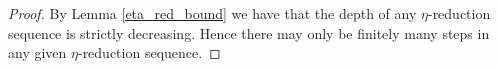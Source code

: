 \begin{proof}
    By Lemma \ref{eta_red_bound} we have that the depth of any $\eta$-reduction sequence is strictly decreasing. Hence there may only be finitely many steps in any given $\eta$-reduction sequence.
\end{proof}

\begin{comment}
We wish to show that $\eta$-reduction enjoys similar normalisation properties to $\beta$-reduction. This should be much easier since $\eta$-redexes are much more distinct.

\begin{defin}
    The \emph{($\eta$-)degree $\partial_{\eta}(t)$ of a redex} is defined as the degree of it's type. If $\Gamma \vdash t \Leftarrow T$ then $\partial_{\eta} := \partial(T)$. This is well-defined due to unicity of typing. [[REFERENCE INVERSION LEMMA HERE]]
\end{defin}

\begin{remark}
    Note that a property of our type theory has made the definition for $\eta$-degree much simpler. We could have defined $\eta$-degree in a similar way to $\beta$-degree but when doing so you can observe that it is redundent. This was not entirely possible in the $\beta$-reduction type because we had some ambiguity for the $\beta$ rules. For example it is not entirely clear what type $v$ is in $\snd(u,v)$, and similarly for the other $\beta$-redexes. In fact we could go a step further and completely ignore typing information since $\eta$-reduction is strongly normalising even in the untyped lambda calculus.
\end{remark}

\begin{remark}
    It should also be noted that in most practical implementations of STLC $\eta$ rules are usually completely ignored since many computations can be run without them. The computational argument is that $\eta$ rules are tedious and difficult to implement in a compiler. It has been observed that $\eta$ rules behave particularly badly with common programming constructs such as subtyping. Later we will discuss depenent types, which is a context where $\eta$ rules cannot easily be ignored.
\end{remark}

\begin{lemma}
    If $r$ is a redex of type $T$ then $\partial (T) < \partial_{\eta}(r)$.
\end{lemma}


\end{comment}
